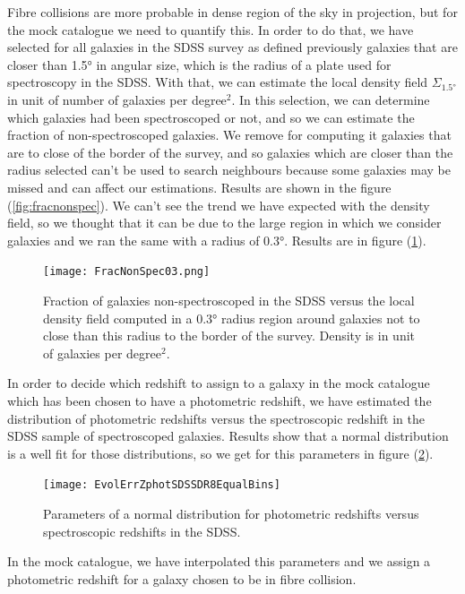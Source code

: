 Fibre collisions are more probable in dense region of the sky in projection, but for the mock catalogue we need to quantify this. In
order to do that, we have selected for all galaxies in the SDSS survey as defined previously galaxies that are closer than
\num{1.5}° in angular size, which is the radius of a plate used for spectroscopy in the SDSS. With that, we can estimate the local
density field $\Sigma_{1.5°}$ in unit of number of galaxies per degree$^2$. In this selection, we can determine which galaxies had
been spectroscoped or not, and so we can estimate the fraction of non-spectroscoped galaxies. We remove for computing it galaxies
that are to close of the border of the survey, and so galaxies which are closer than the radius selected can't be used to search
neighbours because some galaxies may be missed and can affect our estimations. Results are shown in the figure
(\ref{fig:fracnonspec}).
We can't see the trend we have expected with the density field, so we thought that it can be due to the large region in which we
consider galaxies and we ran the same with a radius of \num{0.3}°. Results are in figure (\ref{fig:fracnonspec0.3}).
\begin{figure}[htb]
	\centering
	\texttt{[image: FracNonSpec03.png]}
	\caption{\footnotesize{}Fraction of galaxies non-spectroscoped in the SDSS versus the local density field computed in a
	0.3° radius region around galaxies not to close than this radius to the border of the survey. Density is in unit of galaxies
	per degree$^2$.}
	\label{fig:fracnonspec0.3}
\end{figure}

In order to decide which redshift to assign to a galaxy in the mock catalogue which has been chosen to have a photometric redshift,
we have estimated the distribution of photometric redshifts versus the spectroscopic redshift in the SDSS sample of spectroscoped
galaxies. Results show that a normal distribution is a well fit for those distributions, so we get for this parameters in figure
(\ref{fig:evolnormred}).
\begin{figure}[htb]
	\centering
	\texttt{[image: EvolErrZphotSDSSDR8EqualBins]}
	\caption{\footnotesize{}Parameters of a normal distribution for photometric redshifts versus spectroscopic redshifts in the
	SDSS.}
	\label{fig:evolnormred}
\end{figure}

In the mock catalogue, we have interpolated this parameters and we assign a photometric redshift for a galaxy chosen to be in fibre
collision.

